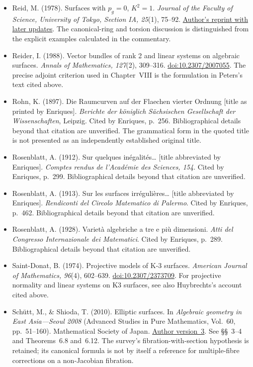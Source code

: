 \begin{sloppypar}
\begin{itemize}
\item Reid, M. (1978). Surfaces with $p_g=0$, $K^2=1$. \emph{Journal of the Faculty of Science, University of Tokyo, Section IA, 25}(1), 75--92. \href{https://mreid.warwick.ac.uk/Reprint/pg0K21.pdf}{Author's reprint with later updates}. The canonical-ring and torsion discussion is distinguished from the explicit examples calculated in the commentary.

\item Reider, I. (1988). Vector bundles of rank 2 and linear systems on algebraic surfaces. \emph{Annals of Mathematics, 127}(2), 309--316. \href{https://doi.org/10.2307/2007055}{doi:10.2307/2007055}. The precise adjoint criterion used in Chapter~VIII is the formulation in Peters's text cited above.

\item Rohn, K. (1897). Die Raumcurven auf der Flaechen vierter Ordnung [title as printed by Enriques]. \emph{Berichte der königlich Sächsischen Gesellschaft der Wissenschaften}, Leipzig. Cited by Enriques, p.~256. Bibliographical details beyond that citation are unverified. The grammatical form in the quoted title is not presented as an independently established original title.

\item Rosenblatt, A. (1912). Sur quelques inégalités\ldots{} [title abbreviated by Enriques]. \emph{Comptes rendus de l'Académie des Sciences, 154}. Cited by Enriques, p.~299. Bibliographical details beyond that citation are unverified.

\item Rosenblatt, A. (1913). Sur les surfaces irrégulières\ldots{} [title abbreviated by Enriques]. \emph{Rendiconti del Circolo Matematico di Palermo}. Cited by Enriques, p.~462. Bibliographical details beyond that citation are unverified.

\item Rosenblatt, A. (1928). Varietà algebriche a tre e più dimensioni. \emph{Atti del Congresso Internazionale dei Matematici}. Cited by Enriques, p.~289. Bibliographical details beyond that citation are unverified.

\item Saint-Donat, B. (1974). Projective models of K-3 surfaces. \emph{American Journal of Mathematics, 96}(4), 602--639. \href{https://doi.org/10.2307/2373709}{doi:10.2307/2373709}. For projective normality and linear systems on K3 surfaces, see also Huybrechts's account cited above.

\item Schütt, M., \& Shioda, T. (2010). Elliptic surfaces. In \emph{Algebraic geometry in East Asia---Seoul 2008} (Advanced Studies in Pure Mathematics, Vol.~60, pp.~51--160). Mathematical Society of Japan. \href{https://arxiv.org/abs/0907.0298}{Author version~3}. See \S\S~3--4 and Theorems~6.8 and~6.12. The survey's fibration-with-section hypothesis is retained; its canonical formula is not by itself a reference for multiple-fibre corrections on a non-Jacobian fibration.


\end{itemize}
\end{sloppypar}
